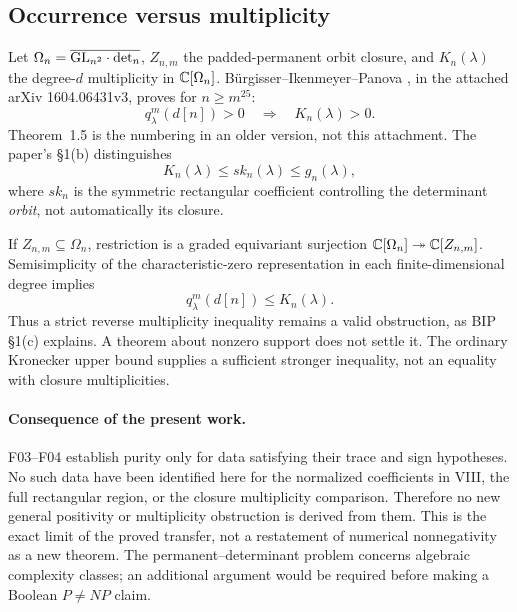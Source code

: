 \documentclass[11pt,a4paper]{article}
\newcommand{\fid}[1]{\textsf{#1}}\newcommand{\gate}[1]{\textsf{#1}}
\theoremstyle{named}\newtheorem{finding}{Finding}[section]
\theoremstyle{definition}\newtheorem{definition}[finding]{Definition}
\theoremstyle{remark}\newtheorem{remark}[finding]{Remark}
\begin{document}
\subsection{Occurrence versus multiplicity}
Let $\Omega_n=\overline{\mathrm{GL}_{n^2}\cdot\det_n}$, $Z_{n,m}$ the padded-permanent orbit closure, and $K_n(\lambda)$ the degree-$d$ multiplicity in $\mathbb C[\Omega_n]$. B\"urgisser--Ikenmeyer--Panova \cite[Theorem 1.4]{BIP}, in the attached arXiv 1604.06431v3, proves for $n\ge m^{25}$:
\[
 q^m_\lambda(d[n])>0\quad\Longrightarrow\quad K_n(\lambda)>0.
\]
Theorem~1.5 is the numbering in an older version, not this attachment. The paper's \S1(b) distinguishes
\[
 K_n(\lambda)\le sk_n(\lambda)\le g_n(\lambda),
\]
where $sk_n$ is the symmetric rectangular coefficient controlling the determinant \emph{orbit}, not automatically its closure.

If $Z_{n,m}\subseteq\Omega_n$, restriction is a graded equivariant surjection
$\mathbb C[\Omega_n]\twoheadrightarrow\mathbb C[Z_{n,m}]$. Semisimplicity of the characteristic-zero representation in each finite-dimensional degree implies
\[
 q^m_\lambda(d[n])\le K_n(\lambda).
\]
Thus a strict reverse multiplicity inequality remains a valid obstruction, as BIP \S1(c) explains. A theorem about nonzero support does not settle it. The ordinary Kronecker upper bound supplies a sufficient stronger inequality, not an equality with closure multiplicities.

\paragraph{Consequence of the present work.}
\fid{F03}--\fid{F04} establish purity only for data satisfying their trace and sign hypotheses. No such data have been identified here for the normalized coefficients in VIII, the full rectangular region, or the closure multiplicity comparison. Therefore no new general positivity or multiplicity obstruction is derived from them. This is the exact limit of the proved transfer, not a restatement of numerical nonnegativity as a new theorem. The permanent--determinant problem concerns algebraic complexity classes; an additional argument would be required before making a Boolean $P\ne NP$ claim.
\end{document}
